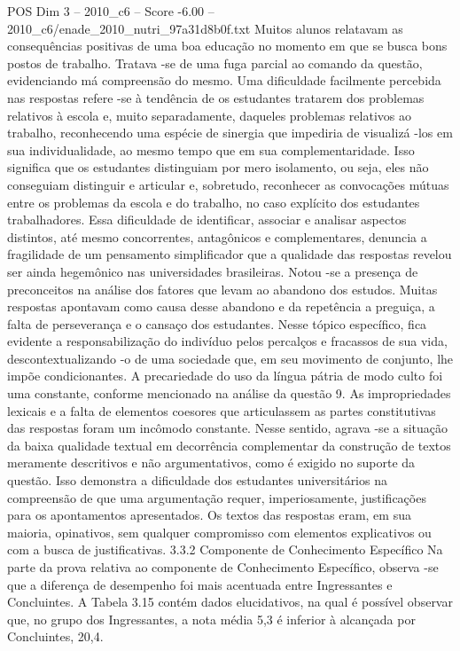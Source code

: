 \begin{textsample}{POS Dim 3 – 2010\_c6 – Score -6.00 – 2010\_c6/enade\_2010\_nutri\_97a31d8b0f.txt}
Muitos alunos relatavam as consequências positivas de uma boa educação no momento em que se busca bons postos de trabalho.
Tratava -se de uma fuga parcial ao comando da questão, evidenciando má compreensão do mesmo.
Uma dificuldade facilmente percebida nas respostas refere -se à tendência de os estudantes tratarem dos problemas relativos à escola e, muito separadamente, daqueles problemas relativos ao trabalho, reconhecendo uma espécie de sinergia que impediria de visualizá -los em sua individualidade, ao mesmo tempo que em sua complementaridade.
Isso significa que os estudantes distinguiam por mero isolamento, ou seja, eles não conseguiam distinguir e articular e, sobretudo, reconhecer as convocações mútuas entre os problemas da escola e do trabalho, no caso explícito dos estudantes trabalhadores.
Essa dificuldade de identificar, associar e analisar aspectos distintos, até mesmo concorrentes, antagônicos e complementares, denuncia a fragilidade de um pensamento simplificador que a qualidade das respostas revelou ser ainda hegemônico nas universidades brasileiras.
Notou -se a presença de preconceitos na análise dos fatores que levam ao abandono dos estudos.
Muitas respostas apontavam como causa desse abandono e da repetência a preguiça, a falta de perseverança e o cansaço dos estudantes.
Nesse tópico específico, fica evidente a responsabilização do indivíduo pelos percalços e fracassos de sua vida, descontextualizando -o de uma sociedade que, em seu movimento de conjunto, lhe impõe condicionantes.
A precariedade do uso da língua pátria de modo culto foi uma constante, conforme mencionado na análise da questão 9.
As impropriedades lexicais e a falta de elementos coesores que articulassem as partes constitutivas das respostas foram um incômodo constante.
Nesse sentido, agrava -se a situação da baixa qualidade textual em decorrência complementar da construção de textos meramente descritivos e não argumentativos, como é exigido no suporte da questão.
Isso demonstra a dificuldade dos estudantes universitários na compreensão de que uma argumentação requer, imperiosamente, justificações para os apontamentos apresentados.
Os textos das respostas eram, em sua maioria, opinativos, sem qualquer compromisso com elementos explicativos ou com a busca de justificativas. 3.3.2 Componente de Conhecimento Específico Na parte da prova relativa ao componente de Conhecimento Específico, observa -se que a diferença de desempenho foi mais acentuada entre Ingressantes e Concluintes.
A Tabela 3.15 contém dados elucidativos, na qual é possível observar que, no grupo dos Ingressantes, a nota média 5,3 é inferior à alcançada por Concluintes, 20,4.

\end{textsample}
